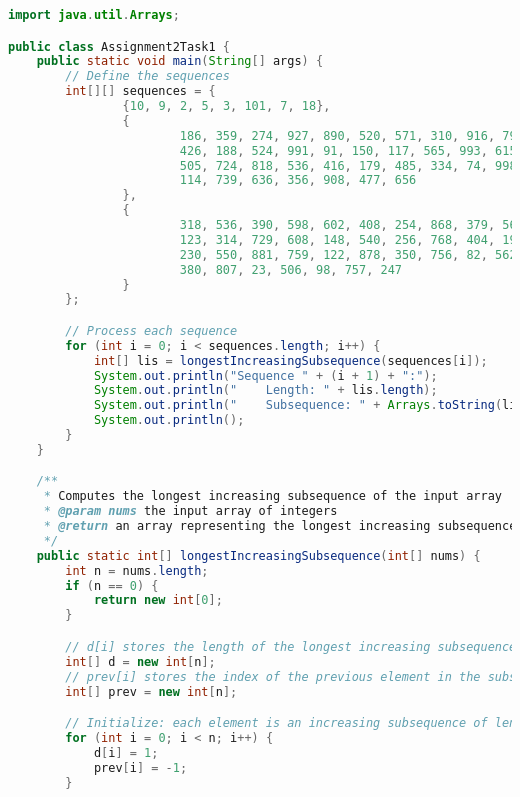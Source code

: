 \documentclass[12pt,letterpaper,final]{report}
\begin{document}
\begin{lstlisting}[language=Java]
import java.util.Arrays;

public class Assignment2Task1 {
    public static void main(String[] args) {
        // Define the sequences
        int[][] sequences = {
                {10, 9, 2, 5, 3, 101, 7, 18},
                {
                        186, 359, 274, 927, 890, 520, 571, 310, 916, 798, 732, 23, 196, 579,
                        426, 188, 524, 991, 91, 150, 117, 565, 993, 615, 48, 811, 594, 303, 191,
                        505, 724, 818, 536, 416, 179, 485, 334, 74, 998, 100, 197, 768, 421,
                        114, 739, 636, 356, 908, 477, 656
                },
                {
                        318, 536, 390, 598, 602, 408, 254, 868, 379, 565, 206, 619, 936, 195,
                        123, 314, 729, 608, 148, 540, 256, 768, 404, 190, 559, 1000, 482, 141, 26,
                        230, 550, 881, 759, 122, 878, 350, 756, 82, 562, 897, 508, 853, 317,
                        380, 807, 23, 506, 98, 757, 247
                }
        };

        // Process each sequence
        for (int i = 0; i < sequences.length; i++) {
            int[] lis = longestIncreasingSubsequence(sequences[i]);
            System.out.println("Sequence " + (i + 1) + ":");
            System.out.println("    Length: " + lis.length);
            System.out.println("    Subsequence: " + Arrays.toString(lis));
            System.out.println();
        }
    }

    /**
     * Computes the longest increasing subsequence of the input array
     * @param nums the input array of integers
     * @return an array representing the longest increasing subsequence
     */
    public static int[] longestIncreasingSubsequence(int[] nums) {
        int n = nums.length;
        if (n == 0) {
            return new int[0];
        }

        // d[i] stores the length of the longest increasing subsequence ending at index i.
        int[] d = new int[n];
        // prev[i] stores the index of the previous element in the subsequence ending at index i.
        int[] prev = new int[n];

        // Initialize: each element is an increasing subsequence of length 1, and no predecessor.
        for (int i = 0; i < n; i++) {
            d[i] = 1;
            prev[i] = -1;
        }


\end{lstlisting}
\end{document}
